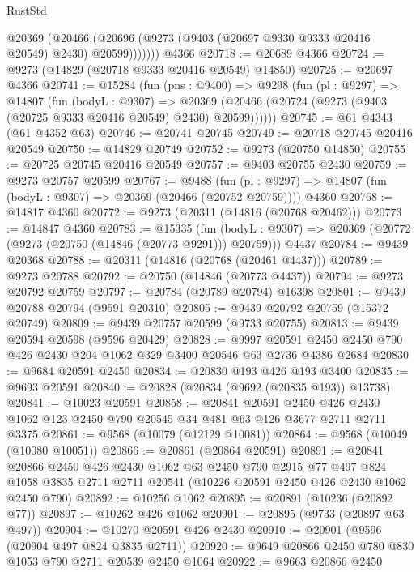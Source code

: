 \begin{lexlean}{RustStd}
\begin{coremodule}
          @20369
            (@20466 (@20696 (@9273 (@9403 (@20697 @9330 @9333 @20416 @20549) @2430) @20599)))))))
    @4366
@20718 := @20689 @4366
@20724 := @9273 (@14829 (@20718 @9333 @20416 @20549) @14850)
@20725 := @20697 @4366
@20741 := @15284
    (fun (pns : @9400) =>
    @9298
      (fun (pl : @9297) =>
      @14807
        (fun (bodyL : @9307) =>
        @20369 (@20466 (@20724 (@9273 (@9403 (@20725 @9333 @20416 @20549) @2430) @20599))))))
@20745 := @61 @4343 (@61 @4352 @63)
@20746 := @20741 @20745
@20749 := @20718 @20745 @20416 @20549
@20750 := @14829 @20749
@20752 := @9273 (@20750 @14850)
@20755 := @20725 @20745 @20416 @20549
@20757 := @9403 @20755 @2430
@20759 := @9273 @20757 @20599
@20767 := @9488
    (fun (pl : @9297) => @14807 (fun (bodyL : @9307) => @20369 (@20466 (@20752 @20759))))
    @4360
@20768 := @14817 @4360
@20772 := @9273 (@20311 (@14816 (@20768 @20462)))
@20773 := @14847 @4360
@20783 := @15335
    (fun (bodyL : @9307) => @20369 (@20772 (@9273 (@20750 (@14846 (@20773 @9291))) @20759)))
    @4437
@20784 := @9439 @20368
@20788 := @20311 (@14816 (@20768 (@20461 @4437)))
@20789 := @9273 @20788
@20792 := @20750 (@14846 (@20773 @4437))
@20794 := @9273 @20792 @20759
@20797 := @20784 (@20789 @20794) @16398
@20801 := @9439 @20788 @20794 (@9591 @20310)
@20805 := @9439 @20792 @20759 (@15372 @20749)
@20809 := @9439 @20757 @20599 (@9733 @20755)
@20813 := @9439 @20594 @20598 (@9596 @20429)
@20828 := @9997
    @20591
    @2450
    @2450
    @790
    @426
    @2430
    @204
    @1062
    @329
    @3400
    @20546
    @63
    @2736
    @4386
    @2684
@20830 := @9684 @20591 @2450
@20834 := @20830 @193 @426 @193 @3400
@20835 := @9693 @20591
@20840 := @20828 (@20834 (@9692 (@20835 @193)) @13738)
@20841 := @10023 @20591
@20858 := @20841
    @20591
    @2450
    @426
    @2430
    @1062
    @123
    @2450
    @790
    @20545
    @34
    @481
    @63
    @126
    @3677
    @2711
    @2711
    @3375
@20861 := @9568 (@10079 (@12129 @10081))
@20864 := @9568 (@10049 (@10080 @10051))
@20866 := @20861 (@20864 @20591)
@20891 := @20841
    @20866
    @2450
    @426
    @2430
    @1062
    @63
    @2450
    @790
    @2915
    @77
    @497
    @824
    @1058
    @3835
    @2711
    @2711
    @20541
    (@10226 @20591 @2450 @426 @2430 @1062 @2450 @790)
@20892 := @10256 @1062
@20895 := @20891 (@10236 (@20892 @77))
@20897 := @10262 @426 @1062
@20901 := @20895 (@9733 (@20897 @63 @497))
@20904 := @10270 @20591 @426 @2430
@20910 := @20901 (@9596 (@20904 @497 @824 @3835 @2711))
@20920 := @9649 @20866 @2450 @780 @830 @1053 @790 @2711 @20539 @2450 @1064
@20922 := @9663 @20866 @2450

\end{coremodule}
\end{lexlean}
